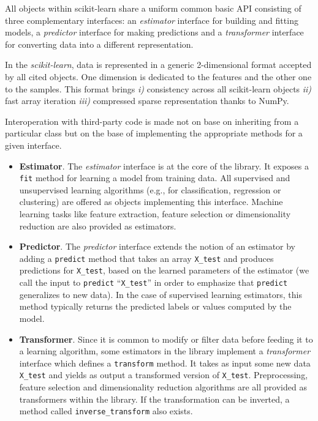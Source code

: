 \documentclass{frontiersSCNS} %
\begin{document}
All objects within scikit-learn share a uniform common basic API consisting of three
complementary interfaces: an \textit{estimator} interface for building and
fitting models, a \textit{predictor} interface for making predictions and a
\textit{transformer} interface for converting data into a different representation.

In the {\em scikit-learn}, data is represented in a generic 2-dimensional format
accepted by all cited objects. One dimension is dedicated to the features and
the other one to the samples. This format brings \textit{i)}
consistency across all scikit-learn objects \textit{ii)} fast array iteration
\textit{iii)} compressed sparse representation thanks to NumPy.

Interoperation with third-party code is made not on base on inheriting from a
particular class but on the base of implementing the appropriate methods for a
given interface.

\begin{itemize}
\item {\bf Estimator}. The \textit{estimator} interface is at the core of the library. It exposes a
    \texttt{fit} method for learning a model from training data.  All supervised
    and unsupervised learning algorithms (e.g., for classification, regression or
    clustering) are offered as objects implementing this interface. Machine
    learning tasks like feature extraction, feature selection or dimensionality
    reduction are also provided as estimators.

\item {\bf Predictor}. The \textit{predictor} interface extends the notion of an estimator
    by adding a \texttt{predict}
    method that takes an array \texttt{X\_test} and produces
    predictions for \texttt{X\_test}, based on the learned parameters of the
    estimator (we call the input to \texttt{predict} ``\texttt{X\_test}'' in order
    to emphasize that \texttt{predict} generalizes to new data). In the case of
    supervised learning estimators, this method typically returns the predicted
    labels or values computed by the model.

\item {\bf Transformer}. Since it is common to modify or filter data before feeding it to a learning
    algorithm, some estimators in the library implement a \textit{transformer}
    interface which defines a \texttt{transform} method. It takes as input some new
    data \texttt{X\_test} and yields as output a transformed version of
    \texttt{X\_test}. Preprocessing, feature selection and dimensionality reduction
    algorithms are all provided as transformers within the library. If the transformation
    can be inverted, a method called \verb!inverse_transform! also exists.

\end{itemize}
\end{document}
